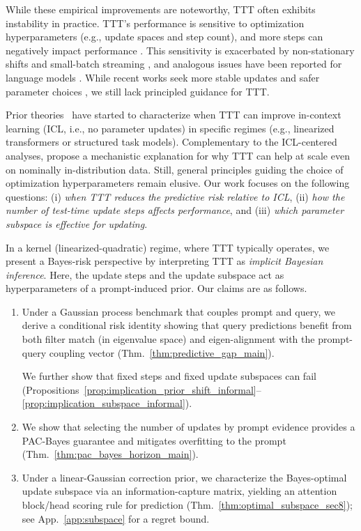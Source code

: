 \documentclass{article}
\theoremstyle{plain}
\theoremstyle{definition}
\theoremstyle{remark}
\begin{document}
While these empirical improvements are noteworthy, TTT often exhibits instability in practice. TTT's performance is sensitive to optimization hyperparameters (e.g., update spaces and step count), and more steps can negatively impact performance \citep{pmlr-v202-zhao23d}. This sensitivity is exacerbated by non-stationary shifts and small-batch streaming \citep{Boudiaf_2022_CVPR,pmlr-v162-niu22a}, and analogous issues have been reported for language models \citep{akyurek2025the}. While recent works seek more stable updates and safer parameter choices \citep{alfarra2025testtime,sahoo2025layer}, we still lack principled guidance for TTT.

Prior theories~\citep{gozeten2025testtime,kuwataka2025test} have started to characterize when TTT can improve in-context learning (ICL, i.e., no parameter updates) in specific regimes (e.g., linearized transformers or structured task models). Complementary to the ICL-centered analyses, \citet{hubotter2025specialization} propose a mechanistic explanation for why TTT can help at scale even on nominally in-distribution data. Still, general principles guiding the choice of optimization hyperparameters remain elusive. Our work focuses on the following questions: (i) \textit{when TTT reduces the predictive risk relative to ICL}, (ii) \textit{how the number of test-time update steps affects performance}, and (iii) \textit{which parameter subspace is effective for updating}.

In a kernel (linearized-quadratic) regime, where TTT typically operates, we present a Bayes-risk perspective by interpreting TTT as \emph{implicit Bayesian inference}. Here, the update steps and the update subspace act as hyperparameters of a prompt-induced prior. Our claims are as follows.
\begin{enumerate}[label=\textbf{(C\arabic*)}, leftmargin=*,itemsep=1pt, parsep=0pt, topsep=0pt, partopsep=0pt, before=\vspace{-0.4\baselineskip}]
\item Under a Gaussian process benchmark that couples prompt and query, we derive a conditional risk identity showing that query predictions benefit from both filter match (in eigenvalue space) and eigen-alignment with the prompt-query coupling vector (Thm.~\ref{thm:predictive_gap_main}).

We further show that fixed steps and fixed update subspaces can fail (Propositions~\ref{prop:implication_prior_shift_informal}--\ref{prop:implication_subspace_informal}).

\item We show that selecting the number of updates by prompt evidence provides a PAC-Bayes guarantee and mitigates overfitting to the prompt (Thm.~\ref{thm:pac_bayes_horizon_main}).

\item Under a linear-Gaussian correction prior, we characterize the Bayes-optimal update subspace via an information-capture matrix, yielding an attention block/head scoring rule for prediction (Thm.~\ref{thm:optimal_subspace_sec8}); see App.~\ref{app:subspace} for a regret bound.
\end{enumerate}
\end{document}
